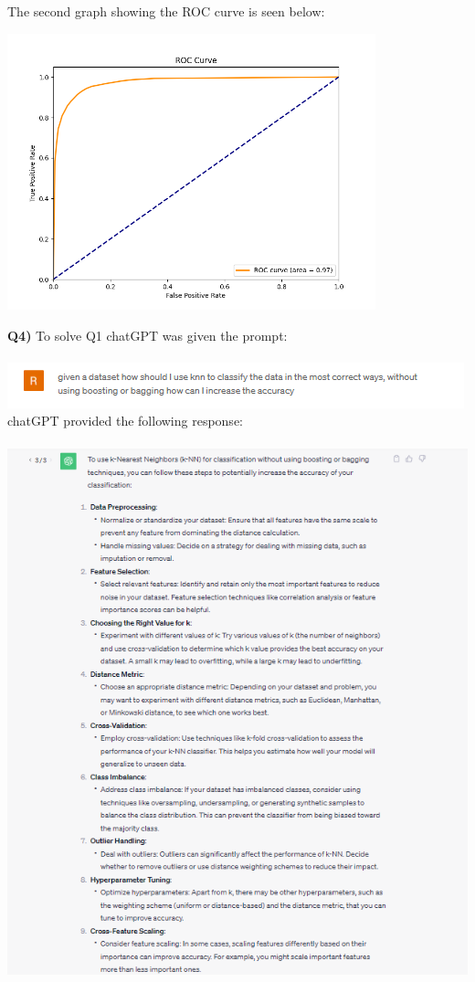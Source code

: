 \documentclass{article}
\begin{document}
\begin{titlepage}
\begin{center}
\end{center}
The second graph showing the ROC curve is seen below: \\
\begin{center}
\includegraphics[width=0.8\textwidth]{roccurve.png}
\end{center}
\newpage
\textbf{Q4)} To solve Q1 chatGPT was given the prompt: \\\\
\includegraphics[width=\textwidth]{q1prompt.png}
chatGPT provided the following response: \\\\
\includegraphics[width=\textwidth]{q1response.png}

\end{titlepage}
\end{document}
